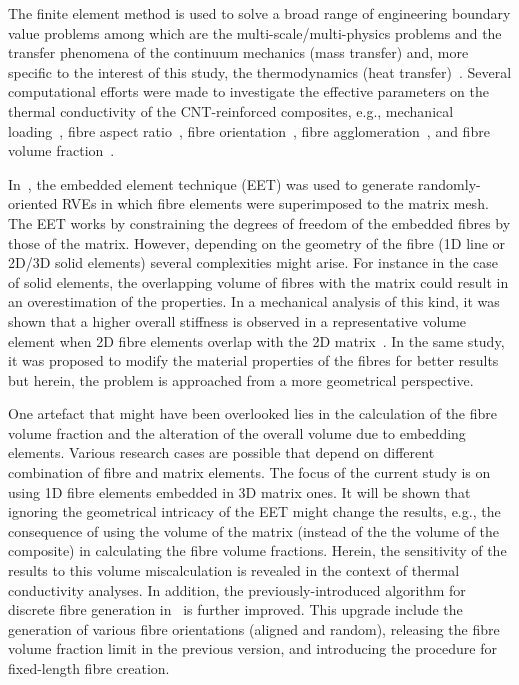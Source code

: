 	The finite element method is used to solve a broad range of engineering boundary value problems among which are the multi-scale/multi-physics problems and the transfer phenomena of the continuum mechanics (mass transfer) and, more specific to the interest of this study, the thermodynamics (heat transfer)~\autocite{Chen.2016b}. Several computational efforts were made to investigate the effective parameters on the thermal conductivity of the CNT-reinforced composites, e.g., mechanical loading~\autocite{Mahdavi.2017}, fibre aspect ratio~\autocite{Lusti.2004,Afrooz.2015}, fibre orientation~\autocite{Khani.2016,Makvandi.2014}, fibre agglomeration~\autocite{Bakshi.2010,Hedia.2016}, and fibre volume fraction~\autocite{AlasvandZarasvand.2016,Chen.2004}.
	
	\red
	In~\autocite{Javanbakht.2016}, the embedded element technique (EET) was used to generate randomly-oriented RVEs in which fibre elements were superimposed to the matrix mesh. The EET works by constraining the degrees of freedom of the embedded fibres by those of the matrix. However, depending on the geometry of the fibre (1D line or 2D/3D solid elements) several complexities might arise. For instance in the case of solid elements, the overlapping volume of fibres with the matrix could result in an overestimation of the properties. In a mechanical analysis of this kind, it was shown that a higher overall stiffness is observed in a representative volume element when 2D fibre elements overlap with the 2D matrix~\parencite{Hoffmann.2010}. In the same study, it was proposed to modify the material properties of the fibres for better results but herein, the problem is approached from a more geometrical perspective.
	
	One artefact that might have been overlooked lies in the calculation of the fibre volume fraction and the alteration of the overall volume due to embedding elements. Various research cases are possible that depend on different combination of fibre and matrix elements. The focus of the current study is on using 1D fibre elements embedded in 3D matrix ones. It will be shown that ignoring the geometrical intricacy of the EET might change the results, e.g., the consequence of using the volume of the matrix (instead of the the volume of the composite) in calculating the fibre volume fractions. Herein, the sensitivity of the results to this volume miscalculation is revealed in the context of thermal conductivity analyses. In addition, the previously-introduced algorithm for discrete fibre generation in~\autocite{Javanbakht.2016} is further improved. This upgrade include the generation of various fibre orientations (aligned and random), releasing the fibre volume fraction limit in the previous version, and introducing the procedure for fixed-length fibre creation.
	\bl
	
